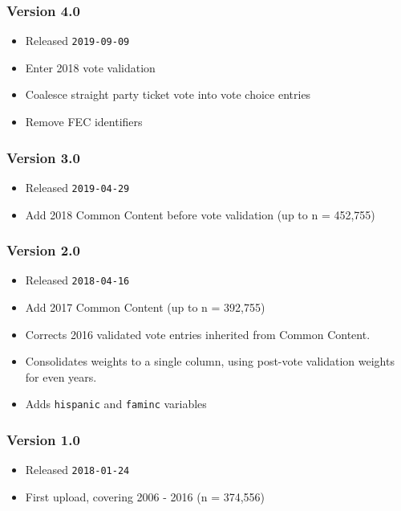\documentclass[10pt,article,oneside]{memoir}
\theoremstyle{definition}
\begin{document}
\hypertarget{version-4.0}{%
\subsubsection{Version 4.0}\label{version-4.0}}

\begin{itemize}
\tightlist
\item
  Released \texttt{2019-09-09}
\item
  Enter 2018 vote validation
\item
  Coalesce straight party ticket vote into vote choice entries
\item
  Remove FEC identifiers
\end{itemize}

\hypertarget{version-3.0}{%
\subsubsection{Version 3.0}\label{version-3.0}}

\begin{itemize}
\tightlist
\item
  Released \texttt{2019-04-29}
\item
  Add 2018 Common Content before vote validation (up to n = 452,755)
\end{itemize}

\hypertarget{version-2.0}{%
\subsubsection{Version 2.0}\label{version-2.0}}

\begin{itemize}
\tightlist
\item
  Released \texttt{2018-04-16}
\item
  Add 2017 Common Content (up to n = 392,755)
\item
  Corrects 2016 validated vote entries inherited from Common Content.
\item
  Consolidates weights to a single column, using post-vote validation
  weights for even years.
\item
  Adds \texttt{hispanic} and \texttt{faminc} variables
\end{itemize}

\hypertarget{version-1.0}{%
\subsubsection{Version 1.0}\label{version-1.0}}

\begin{itemize}
\tightlist
\item
  Released \texttt{2018-01-24}
\item
  First upload, covering 2006 - 2016 (n = 374,556)
\end{itemize}
\end{document}
